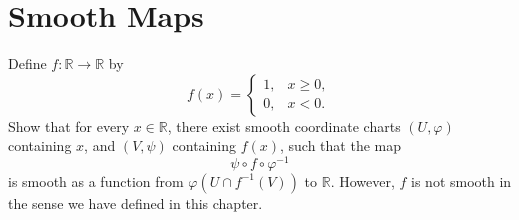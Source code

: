\chapter{Smooth Maps}

\begin{problem}
    Define \( f : \mathbb{R} \to \mathbb{R} \) by
    \[
    f(x) =
    \begin{cases}
        1, & x \geq 0, \\
        0, & x < 0.
    \end{cases}
    \]
    Show that for every \( x \in \mathbb{R} \), there exist smooth coordinate charts \( (U, \varphi) \) containing \( x \), and \( (V, \psi) \) containing \( f(x) \), such that the map
    \[
    \psi \circ f \circ \varphi^{-1}
    \]
    is smooth as a function from \( \varphi(U \cap f^{-1}(V)) \) to \( \mathbb{R} \). However, \( f \) is not smooth in the sense we have defined in this chapter.
\end{problem}